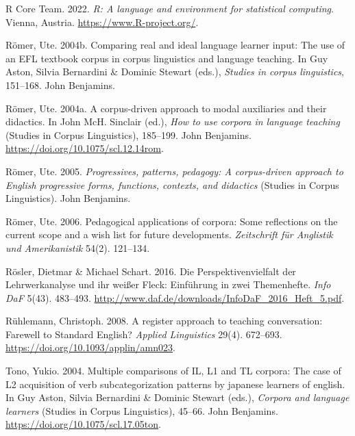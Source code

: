 \documentclass[
  letterpaper,
  DIV=11,
  numbers=noendperiod]{scrreprt}
\newlength{\cslhangindent}
\newenvironment{CSLReferences}[2] %
 {\begin{list}{}{%
  \setlength{\itemindent}{0pt}
  \setlength{\leftmargin}{0pt}
  \setlength{\parsep}{0pt}
  \ifodd #1
   \setlength{\leftmargin}{\cslhangindent}
   \setlength{\itemindent}{-1\cslhangindent}
  \fi
  \setlength{\itemsep}{#2\baselineskip}}}
 {\end{list}}
\begin{document}
\begin{CSLReferences}{1}{0}
R Core Team. 2022. \emph{R: A language and environment for statistical
computing}. Vienna, Austria. \url{https://www.R-project.org/}.

Römer, Ute. 2004b. Comparing real and ideal language learner input: The
use of an EFL textbook corpus in corpus linguistics and language
teaching. In Guy Aston, Silvia Bernardini \& Dominic Stewart (eds.),
\emph{Studies in corpus linguistics}, 151--168. John Benjamins.

Römer, Ute. 2004a. A corpus-driven approach to modal auxiliaries and
their didactics. In John McH. Sinclair (ed.), \emph{How to use corpora
in language teaching} (Studies in Corpus Linguistics), 185--199. John
Benjamins. \url{https://doi.org/10.1075/scl.12.14rom}.

Römer, Ute. 2005. \emph{Progressives, patterns, pedagogy: A
corpus-driven approach to {English} progressive forms, functions,
contexts, and didactics} (Studies in Corpus Linguistics). John
Benjamins.

Römer, Ute. 2006. Pedagogical applications of corpora: Some reflections
on the current scope and a wish list for future developments.
\emph{Zeitschrift für Anglistik und Amerikanistik} 54(2). 121--134.

Rösler, Dietmar \& Michael Schart. 2016. Die {Perspektivenvielfalt} der
{Lehrwerkanalyse} und ihr weißer {Fleck}: {Einführung} in zwei
{Themenhefte}. \emph{Info DaF} 5(43). 483--493.
\url{http://www.daf.de/downloads/InfoDaF_2016_Heft_5.pdf}.

Rühlemann, Christoph. 2008. A register approach to teaching
conversation: Farewell to {Standard} {English}? \emph{Applied
Linguistics} 29(4). 672--693.
\url{https://doi.org/10.1093/applin/amn023}.

Tono, Yukio. 2004. Multiple comparisons of IL, L1 and TL corpora: The
case of L2 acquisition of verb subcategorization patterns by japanese
learners of english. In Guy Aston, Silvia Bernardini \& Dominic Stewart
(eds.), \emph{Corpora and language learners} (Studies in Corpus
Linguistics), 45--66. John Benjamins.
\url{https://doi.org/10.1075/scl.17.05ton}.


\end{CSLReferences}
\end{document}
